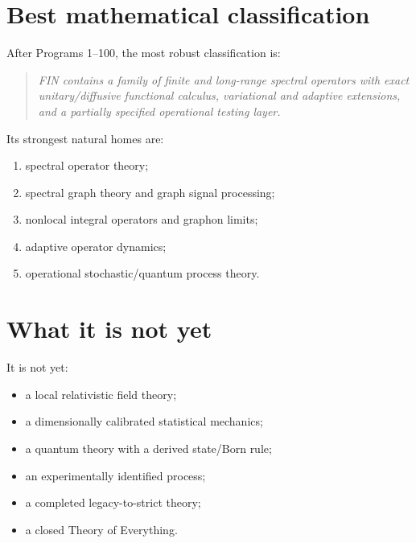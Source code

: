 \documentclass[11pt,a4paper,openany]{report}
\begin{document}
\section{Best mathematical classification}

After Programs 1--100, the most robust classification is:

\begin{quote}\itshape
FIN contains a family of finite and long-range spectral operators with exact unitary/\allowbreak{}diffusive functional calculus, variational and adaptive extensions, and a partially specified operational testing layer.

\end{quote}

Its strongest natural homes are:

\begin{enumerate}
\item 
spectral operator theory;

\item 
spectral graph theory and graph signal processing;

\item 
nonlocal integral operators and graphon limits;

\item 
adaptive operator dynamics;

\item 
operational stochastic/\allowbreak{}quantum process theory.

\end{enumerate}

\section{What it is not yet}

It is not yet:

\begin{itemize}
\item 
a local relativistic field theory;

\item 
a dimensionally calibrated statistical mechanics;

\item 
a quantum theory with a derived state/\allowbreak{}Born rule;

\item 
an experimentally identified process;

\item 
a completed legacy-to-strict theory;

\item 
a closed Theory of Everything.

\end{itemize}
\end{document}
